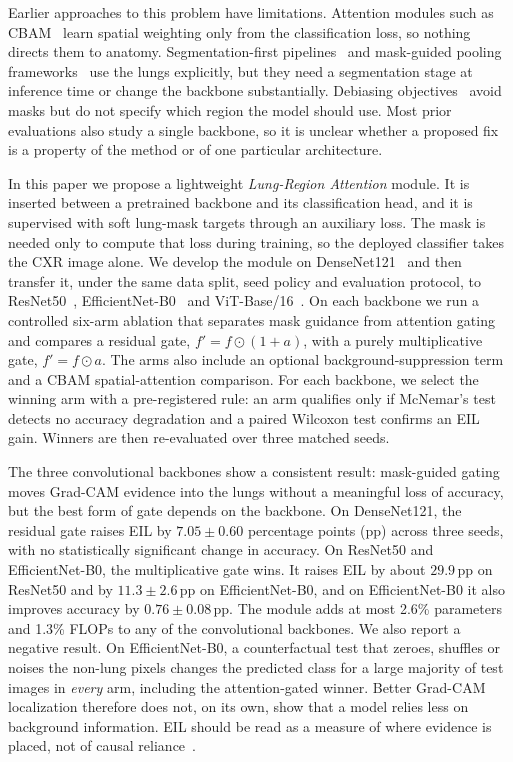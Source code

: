 Earlier approaches to this problem have limitations. Attention modules such as CBAM~\cite{woo2018cbam} learn spatial weighting only from the classification loss, so nothing directs them to anatomy. Segmentation-first pipelines~\cite{bassi2022segmentation} and mask-guided pooling frameworks~\cite{mamun2026beyond} use the lungs explicitly, but they need a segmentation stage at inference time or change the backbone substantially. Debiasing objectives~\cite{luo2022pseudobias} avoid masks but do not specify which region the model should use. Most prior evaluations also study a single backbone, so it is unclear whether a proposed fix is a property of the method or of one particular architecture.

In this paper we propose a lightweight \emph{Lung-Region Attention} module. It is inserted between a pretrained backbone and its classification head, and it is supervised with soft lung-mask targets through an auxiliary loss. The mask is needed only to compute that loss during training, so the deployed classifier takes the CXR image alone. We develop the module on DenseNet121~\cite{huang2017densenet} and then transfer it, under the same data split, seed policy and evaluation protocol, to ResNet50~\cite{he2016resnet}, EfficientNet-B0~\cite{tan2019efficientnet} and ViT-Base/16~\cite{dosovitskiy2021vit}. On each backbone we run a controlled six-arm ablation that separates mask guidance from attention gating and compares a residual gate, $f' = f \odot (1 + a)$, with a purely multiplicative gate, $f' = f \odot a$. The arms also include an optional background-suppression term and a CBAM spatial-attention comparison. For each backbone, we select the winning arm with a pre-registered rule: an arm qualifies only if McNemar's test detects no accuracy degradation and a paired Wilcoxon test confirms an EIL gain. Winners are then re-evaluated over three matched seeds.

The three convolutional backbones show a consistent result: mask-guided gating moves Grad-CAM evidence into the lungs without a meaningful loss of accuracy, but the best form of gate depends on the backbone. On DenseNet121, the residual gate raises EIL by $7.05 \pm 0.60$ percentage points (pp) across three seeds, with no statistically significant change in accuracy. On ResNet50 and EfficientNet-B0, the multiplicative gate wins. It raises EIL by about $29.9$\,pp on ResNet50 and by $11.3 \pm 2.6$\,pp on EfficientNet-B0, and on EfficientNet-B0 it also improves accuracy by $0.76 \pm 0.08$\,pp. The module adds at most 2.6\% parameters and 1.3\% FLOPs to any of the convolutional backbones. We also report a negative result. On EfficientNet-B0, a counterfactual test that zeroes, shuffles or noises the non-lung pixels changes the predicted class for a large majority of test images in \emph{every} arm, including the attention-gated winner. Better Grad-CAM localization therefore does not, on its own, show that a model relies less on background information. EIL should be read as a measure of where evidence is placed, not of causal reliance~\cite{adebayo2018sanity}.

